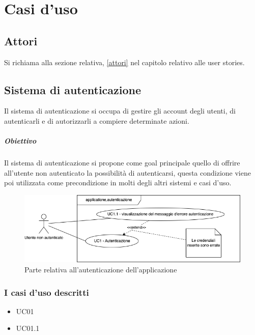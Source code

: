 \chapter{Casi d'uso}\label{casi-d-uso}
\section{Attori}

Si richiama alla sezione relativa, \ref{attori} nel capitolo relativo alle user stories.

\section{Sistema di autenticazione}

Il sistema di autenticazione si occupa di gestire gli account degli utenti, di autenticarli e di autorizzarli a compiere determinate azioni.

\paragraph{Obiettivo} Il sistema di autenticazione si propone come goal principale quello di offrire all'utente non autenticato la possibilità di autenticarsi, questa condizione viene poi utilizzata come precondizione in molti degli altri sistemi e casi d'uso.

\begin{figure}[h]
    \includegraphics[width=\textwidth]{contenuti/img/casi_uso_grafici-applicazione,autenticazione.png}
    \caption{Parte relativa all'autenticazione dell'applicazione}
    \label{fig:autenticazione}
\end{figure}

\subsection{I casi d'uso descritti}

\begin{itemize}
    \item UC01
    \item UC01.1
\end{itemize}

